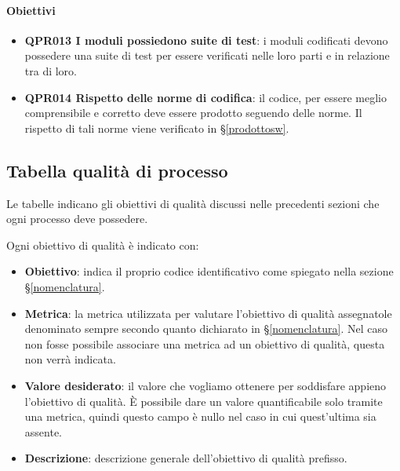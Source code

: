         \paragraph*{Obiettivi}
        \begin{itemize}
            \item \textbf{QPR013 I moduli possiedono suite di test}: i moduli codificati devono possedere una suite di test per essere verificati nelle loro parti e in relazione tra di loro.
            \item \textbf{QPR014 Rispetto delle norme di codifica}: il codice, per essere meglio comprensibile e corretto deve essere prodotto seguendo delle norme. Il rispetto di tali norme viene verificato in \S\ref{prodottosw}.
        \end{itemize}

\subsection{Tabella qualità di processo}
Le tabelle indicano gli obiettivi di qualità discussi nelle precedenti sezioni che ogni processo deve possedere.

Ogni obiettivo di qualità è indicato con:

\begin{itemize}
	\item \textbf{Obiettivo}: indica il proprio codice identificativo come spiegato nella sezione \S\ref{nomenclatura}.
	\item \textbf{Metrica}: la metrica utilizzata per valutare l'obiettivo di qualità assegnatole denominato sempre secondo quanto dichiarato in \S\ref{nomenclatura}. Nel caso non fosse possibile associare una metrica ad un obiettivo di qualità, questa non verrà indicata.
	\item \textbf{Valore desiderato}: il valore che vogliamo ottenere per soddisfare appieno l'obiettivo di qualità. È possibile dare un valore quantificabile solo tramite una metrica, quindi questo campo è nullo nel caso in cui quest'ultima sia assente.
	\item \textbf{Descrizione}: descrizione generale dell'obiettivo di qualità prefisso.
\end{itemize}

\newcommand{\grigiodesc}{gray!15}

